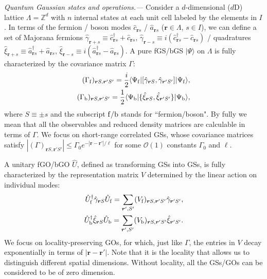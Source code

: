 \documentclass[prl,twocolumn,preprintnumbers,superscriptaddress,amsmath,amssymb]{revtex4-1}
\begin{document}
\emph{Quantum Gaussian states and operations.---} Consider a $d$-dimensional ($d$D) lattice $\Lambda=\mathbb{Z}^d$ with $n$ internal states at each unit cell labeled by the elements in $I$. In terms of the fermion / boson modes $\hat c_{\boldsymbol{r}s}$ / $\hat a_{\boldsymbol{r}s}$ ($\boldsymbol{r}\in\Lambda$, $s\in I$), we can define a set of Majorana fermions $\hat\gamma_{\boldsymbol{r}+s}\equiv \hat c_{\boldsymbol{r}s}^\dag+ \hat c_{\boldsymbol{r}s}$, $\hat \gamma_{\boldsymbol{r}-s}\equiv i(\hat c_{\boldsymbol{r}s}^\dag- \hat c_{\boldsymbol{r}s})$ / quadratures $\hat\xi_{\boldsymbol{r}+s}\equiv \hat a_{\boldsymbol{r}s}^\dag+ \hat a_{\boldsymbol{r}s}$, $\hat\xi_{\boldsymbol{r}-s}\equiv i(\hat a_{\boldsymbol{r}s}^\dag-\hat a_{\boldsymbol{r}s})$. A pure fGS/bGS $|\Psi \rangle$ on $\Lambda$ is fully \cite{bG0} characterized by the covariance matrix $\Gamma $:
\begin{equation}
\begin{split}
(\Gamma_{\rm f})_{\boldsymbol{r}S,\boldsymbol{r}'S'} = \frac{i}{2}\langle\Psi_{\rm f}|[\hat\gamma_{\boldsymbol{r}S}, \hat\gamma_{\boldsymbol{r}'S'}]|\Psi_{\rm f}\rangle,\\
(\Gamma_{\rm b})_{\boldsymbol{r}S,\boldsymbol{r}'S'} = \frac{1}{2}\langle\Psi_{\rm b}|\{\hat\xi_{\boldsymbol{r}S}, \hat\xi_{\boldsymbol{r}'S'}\}|\Psi_{\rm b}\rangle,
\end{split}
\end{equation}
where $S\equiv \pm s$ and the subscript $\rm f/b$ stands for ``fermion/boson". By fully we mean that all the observables and reduced density matrices are calculable in terms of $\Gamma$. We focus on short-range correlated GSs, whose covariance matrices satisfy $|(\Gamma)_{\boldsymbol{r}S,\boldsymbol{r}'S'}|\le \Gamma_0 e^{-|\boldsymbol{r}-\boldsymbol{r}'|/\ell}$ for some $\mathcal{O}(1)$ constants $\Gamma_0$ and $\ell$. 

A unitary fGO/bGO $\hat U $, defined as transforming GSs into GSs, is fully characterized by the representation matrix $V$ determined by the linear action on individual modes: 
\begin{equation}
\begin{split}
\hat U_{\rm f}^\dag\hat \gamma_{\boldsymbol{r}S}\hat U_{\rm f} = \sum_{\boldsymbol{r}',S'}(V_{\rm f})_{\boldsymbol{r}S,\boldsymbol{r}'S'}\hat \gamma_{\boldsymbol{r}'S'}, \\
\hat U_{\rm b}^\dag\hat \xi_{\boldsymbol{r}S}\hat U_{\rm b}= \sum_{\boldsymbol{r}',S'}(V_{\rm b})_{\boldsymbol{r}S,\boldsymbol{r}'S'}\hat \xi_{\boldsymbol{r}'S'}. 
\end{split}
\end{equation}
We focus on locality-preserving GOs, for which, just like $\Gamma $, the entries in $V $ decay exponentially in terms of $|\boldsymbol{r} - \boldsymbol{r}'|$. Note that it is the locality that allows us to distinguish different spatial dimensions. Without locality, all the GSs/GOs can be considered to be of zero dimension.
\end{document}
